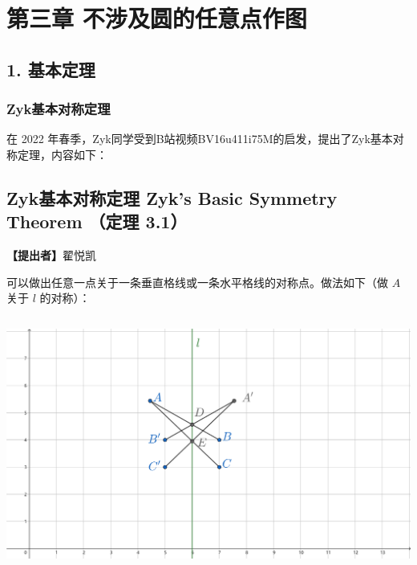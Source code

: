 \documentclass[UTF8]{article}
\author{}
\date{}
\begin{document}
\hypertarget{ux7b2cux4e09ux7ae0-ux4e0dux6d89ux53caux5706ux7684ux4efbux610fux70b9ux4f5cux56fe}{%
\section{第三章
不涉及圆的任意点作图}\label{ux7b2cux4e09ux7ae0-ux4e0dux6d89ux53caux5706ux7684ux4efbux610fux70b9ux4f5cux56fe}}

\hypertarget{ux57faux672cux5b9aux7406}{%
\subsection{1. 基本定理}\label{ux57faux672cux5b9aux7406}}

\hypertarget{zykux57faux672cux5bf9ux79f0ux5b9aux7406}{%
\subsubsection{Zyk基本对称定理}\label{zykux57faux672cux5bf9ux79f0ux5b9aux7406}}

在 2022
年春季，Zyk同学受到B站视频BV16u411i75M的启发，提出了Zyk基本对称定理，内容如下：

\hypertarget{zykux57faux672cux5bf9ux79f0ux5b9aux7406-zyks-basic-symmetry-theorem-ux5b9aux7406-3.1}{%
\subsection{Zyk基本对称定理 Zyk's Basic Symmetry Theorem （定理
3.1）}\label{zykux57faux672cux5bf9ux79f0ux5b9aux7406-zyks-basic-symmetry-theorem-ux5b9aux7406-3.1}}

\textbf{【提出者】}翟悦凯

可以做出任意一点关于一条垂直格线或一条水平格线的对称点。做法如下（做
\(A\) 关于 \(l\) 的对称）：

\includegraphics[width=5.76806in,height=3.27847in]{media/image1.png}
\end{document}
